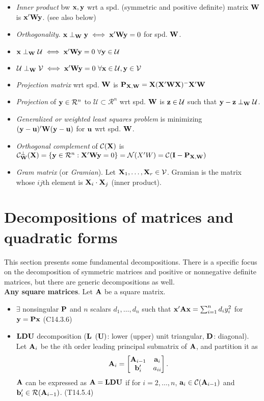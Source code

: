 \documentclass[a4paper, oneside]{book}
\begin{document}
\begin{itemize}
\begin{itemize}
	\item \textit{Inner product} bw $\mathbf{x,y}$ wrt a spd. (symmetric and positive definite) matrix $\mathbf{W}$ is $\mathbf{x'Wy}$. (see also below)
	\item \textit{Orthogonality}. $\mathbf{x}\perp_{\mathbf{W}}\mathbf{y} \iff \mathbf{x'Wy}=0 $ for spd. $\mathbf{W}$.
	\item $\mathbf{x}\perp_{\mathbf{W}}\mathcal{U} \iff  \mathbf{x'Wy}=0 \,\, \forall \mathbf{y} \in \mathcal{U}$ 
	\item $\mathcal{U}\perp_{\mathbf{W}}\mathcal{V} \iff  \mathbf{x'Wy}=0 \,\, \forall \mathbf{x} \in \mathcal{U}, \mathbf{y} \in \mathcal{V}$ 
	\item \textit{Projection matrix} wrt spd. $\mathbf{W}$ is $\mathbf{P_{X,W}=X(X'WX)^-X'W}$
	\item \textit{Projection} of $\mathbf{y}\in\mathcal{R}^n$ to $\mathcal{U} \subset \mathcal{R}^n$ wrt spd. $\mathbf{W}$ is $\mathbf{z}\in\mathcal{U}$ such that $\mathbf{y-z}\perp_{\mathbf{W}}\mathcal{U}$.
	\item \textit{Generalized or weighted least squares problem} is minimizing $\mathbf{(y-u)'W(y-u)}$ for $\mathbf{u}$ wrt spd. $\mathbf{W}$.
	\item \textit{Orthogonal complement} of $\mathcal{C}(\mathbf{X})$ is $\mathcal{C}^\perp_\mathbf{W}(\mathbf{X})=\{\mathbf{y}\in\mathcal{R}^n : \mathbf{X'Wy}=0\}=\mathcal{N}(X'W)=\mathcal{C}(\mathbf{I-P_{X,W}})$
	\item \textit{Gram matrix} (or \textit{Gramian}). Let $\mathbf{X}_1, \hdots, \mathbf{X}_r \in \mathcal{V}$. Gramian is the matrix whose $ij$th element is $\mathbf{X}_{i} \cdot \mathbf{X}_{j}$ (\ie inner product).
	\end{itemize}
\end{itemize}


\section{Decompositions of matrices and quadratic forms}
This section presents some fundamental decompositions. There is a specific focus on the decomposition of symmetric matrices and positive or nonnegative definite matrices, but there are generic decompositions as well.\\

\noindent\textbf{Any square matrices}. Let $\mathbf{A}$ be a square matrix.
\begin{itemize}
\item $\exists$ nonsingular $\mathbf{P}$ and $n$ scalars $d_1, \hdots, d_n$ such that $\mathbf{x'Ax}=\sum_{i=1}^n d_i y_i^2$ for $\mathbf{y=Px}$ (C14.3.6)
\item $\mathbf{LDU}$ decomposition ($\mathbf{L}$ $(\mathbf{U})$: lower (upper) unit triangular, $\mathbf{D}$: diagonal). Let $\mathbf{A}_i$ be the $i$th order leading principal submatrix of $\mathbf{A}$, and partition it as $$\mathbf{A}_i=\begin{bmatrix}
\mathbf{A}_{i-1} & \mathbf{a}_i \\ \mathbf{b}_i' & a_{ii}
\end{bmatrix}.$$ $\mathbf{A}$ can be expressed as $\mathbf{A=LDU}$ if for $i=2,\hdots,n$, $\mathbf{a}_i \in \mathcal{C}(\mathbf{A}_{i-1})$ and $\mathbf{b}'_i \in \mathcal{R}(\mathbf{A}_{i-1})$. (T14.5.4)
\end{itemize}
\end{document}
